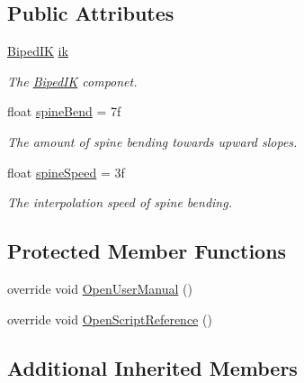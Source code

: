 \subsection*{Public Attributes}
\begin{DoxyCompactItemize}
\item 
\mbox{\hyperlink{class_root_motion_1_1_final_i_k_1_1_biped_i_k}{Biped\+IK}} \mbox{\hyperlink{class_root_motion_1_1_final_i_k_1_1_grounder_biped_i_k_a69a77ba51ff7400f1f124c3a642cccec}{ik}}
\begin{DoxyCompactList}\small\item\em The \mbox{\hyperlink{class_root_motion_1_1_final_i_k_1_1_biped_i_k}{Biped\+IK}} componet. \end{DoxyCompactList}\item 
float \mbox{\hyperlink{class_root_motion_1_1_final_i_k_1_1_grounder_biped_i_k_afe2a4d198e2625f80aeb774c56dc6c3e}{spine\+Bend}} = 7f
\begin{DoxyCompactList}\small\item\em The amount of spine bending towards upward slopes. \end{DoxyCompactList}\item 
float \mbox{\hyperlink{class_root_motion_1_1_final_i_k_1_1_grounder_biped_i_k_a0fe706c78e8624f6e3c8f9fb26cfcb7d}{spine\+Speed}} = 3f
\begin{DoxyCompactList}\small\item\em The interpolation speed of spine bending. \end{DoxyCompactList}\end{DoxyCompactItemize}
\subsection*{Protected Member Functions}
\begin{DoxyCompactItemize}
\item 
override void \mbox{\hyperlink{class_root_motion_1_1_final_i_k_1_1_grounder_biped_i_k_a8e824329a99a8e11da666857d5288ce1}{Open\+User\+Manual}} ()
\item 
override void \mbox{\hyperlink{class_root_motion_1_1_final_i_k_1_1_grounder_biped_i_k_a0a8d9d614597cfd77d596792f702b985}{Open\+Script\+Reference}} ()
\end{DoxyCompactItemize}
\subsection*{Additional Inherited Members}


